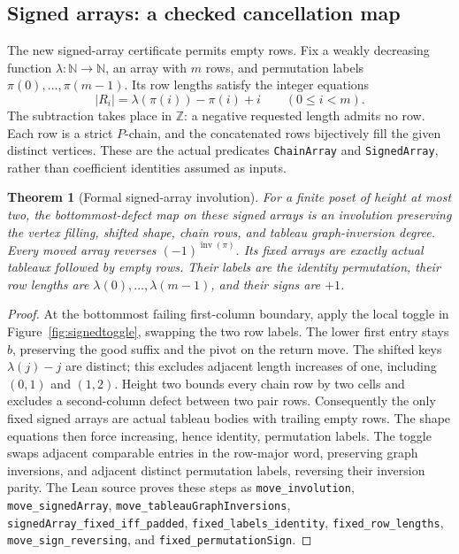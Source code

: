 \documentclass[11pt,a4paper]{article}
\newtheorem{theorem}{Theorem}[section]
\theoremstyle{definition}
\newcommand{\inv}{\operatorname{inv}}
\newcommand{\N}{\mathbb N}
\begin{document}
\subsection{Signed arrays: a checked cancellation map}

The new signed-array certificate permits empty rows. Fix a weakly decreasing
function $\lambda:\N\to\N$, an array with $m$ rows, and permutation labels
$\pi(0),\ldots,\pi(m-1)$. Its row lengths satisfy the integer equations
\[
 |R_i|=\lambda(\pi(i))-\pi(i)+i\qquad(0\le i<m).
\]
The subtraction takes place in $\mathbb Z$: a negative requested length
admits no row. Each row is a strict $P$-chain, and the concatenated rows
bijectively fill the given distinct vertices. These are the actual predicates
\texttt{ChainArray} and \texttt{SignedArray}, rather than coefficient identities
assumed as inputs.

\begin{theorem}[Formal signed-array involution]\label{thm:formalsigned}
For a finite poset of height at most two, the bottommost-defect map on these
signed arrays is an involution preserving the vertex filling, shifted shape,
chain rows, and tableau graph-inversion degree. Every moved array reverses
$(-1)^{\inv(\pi)}$. Its fixed arrays are exactly actual tableaux followed by
empty rows. Their labels are the identity permutation, their row lengths
are $\lambda(0),\ldots,\lambda(m-1)$, and their signs are $+1$.
\end{theorem}
\begin{proof}
At the bottommost failing first-column boundary, apply the local toggle in
Figure~\ref{fig:signedtoggle}, swapping the two row labels. The lower first
entry stays $b$, preserving the good suffix and the pivot on the return move.
The shifted keys $\lambda(j)-j$ are distinct; this excludes adjacent length
increases of one, including $(0,1)$ and $(1,2)$. Height two bounds every chain
row by two cells and excludes a second-column defect between two pair rows.
Consequently the only fixed signed arrays are actual tableau bodies with
trailing empty rows. The shape equations then force increasing, hence identity,
permutation labels. The toggle swaps adjacent comparable entries in the
row-major word, preserving graph inversions, and adjacent distinct permutation
labels, reversing their inversion parity. The Lean source proves these steps
as \texttt{move\_involution}, \texttt{move\_signedArray},
\texttt{move\_tableauGraphInversions},
\texttt{signedArray\_fixed\_iff\_padded},
\texttt{fixed\_labels\_identity}, \texttt{fixed\_row\_lengths},
\texttt{move\_sign\_reversing}, and \texttt{fixed\_permutationSign}.
\end{proof}
\end{document}
